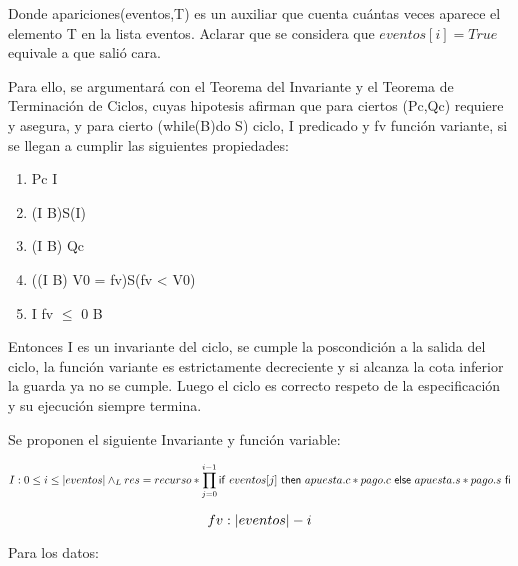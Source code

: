 \documentclass[10pt,a4paper]{article}
\begin{document}
 Donde apariciones(eventos,T) es un auxiliar que cuenta cuántas veces aparece el elemento T en la lista eventos.
 Aclarar que se considera que $eventos[i] = True$ equivale a que salió cara.
   
\vspace{0.3cm} 
   
 Para ello, se argumentará con el Teorema del Invariante y el Teorema de Terminación de Ciclos, cuyas hipotesis afirman que
 para ciertos (Pc,Qc) requiere y asegura, y para cierto (while(B)do S) ciclo, I predicado y fv función variante,
 si se llegan a cumplir las siguientes propiedades:
   
\begin{enumerate} \setlength\itemsep{1cm}
	\item Pc \implica I
   
	\item (I \land B)S(I)
   
	\item (I \land \neg B) \implica Qc %
   
	\item ((I \land B) \land V0 = fv)S(fv < V0)
   
	\item I \land fv $\leq$ 0 \implica \neg B
\end{enumerate}
   
\vspace{0.3cm}
   
 Entonces I es un invariante del ciclo, se cumple la poscondición a la salida del ciclo,
 la función variante es estrictamente decreciente y si alcanza la cota inferior la guarda ya no se cumple.
 Luego el ciclo es correcto respeto de la especificación y su ejecución siempre termina.
   
\vspace{0.3cm}
	
Se proponen el siguiente Invariante y función variable:
   
\begin{equation}
	I: 0 \leq i \leq |eventos| \land _L res = recurso * \prod\limits_{j=0}^{i-1} \mathsf{if}\ eventos[j]\ \mathsf{then}\ apuesta.c * pago.c\ \mathsf{else}\ apuesta.s * pago.s\ \mathsf{fi}
\end{equation}
   
\begin{equation}
	fv: |eventos| - i
\end{equation}
   
 Para los datos:
   
\end{document}
